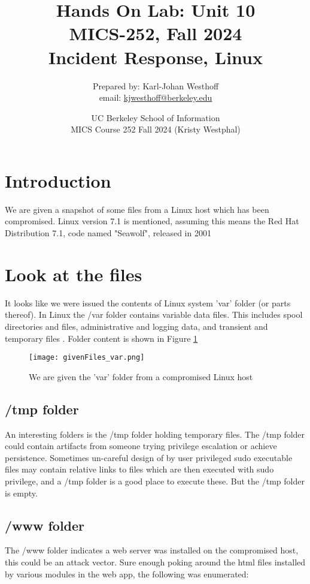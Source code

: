 \documentclass[
	letterpaper, %
	10pt, %
	unnumberedsections, %
	twoside, %
]{APAAssignment}
\title{Hands On Lab: Unit 10 \\ MICS-252, Fall 2024 \\ Incident Response, Linux} %
\date{UC Berkeley School of Information \\
MICS Course 252 Fall 2024 (Kristy Westphal)
}
\author{
	Prepared by: Karl-Johan Westhoff \\
	email: \href{mailto:kjwesthoff@berkeley.edu}{kjwesthoff@berkeley.edu}
}
\begin{document}
\onecolumn
\maketitle %



\section{Introduction}
We are given a snapshot of some files from a Linux host which has been compromised.
Linux version 7.1 is mentioned, assuming this means the Red Hat Distribution 7.1, code named "Seawolf", released in 2001 \cite{RedHatOnWIki}

\section{Look at the files}
It looks like we were issued the contents of Linux system 'var' folder (or parts thereof). In Linux the /var folder contains variable data files. This includes spool directories and files, administrative and logging data, and transient and temporary files \cite{VarFolder}. Folder content is shown in Figure \ref{fig:givenFiles}

\begin{figure}[!htp] %
	\centering
	\texttt{[image: givenFiles\_var.png]}
	\caption{We are given the 'var' folder from a compromised Linux host}
	\label{fig:givenFiles}
\end{figure}

\subsection{/tmp folder}
An interesting folders is the /tmp folder holding temporary files. The /tmp folder could contain artifacts from someone trying privilege escalation or achieve persistence. Sometimes un-careful design of by user privileged sudo executable files may contain relative links to files which are then executed with sudo privilege, and a /tmp folder is a good place to execute these. But the /tmp folder is empty.

\subsection{/www folder}
The /www folder indicates a web server was installed on the compromised host, this could be an attack vector. Sure enough poking around the html files installed by various modules in the web app, the following was enumerated:
\end{document}

